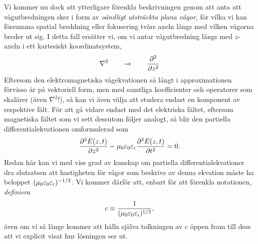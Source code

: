 Vi kommer nu dock att ytterligare f{\"o}renkla beskrivningen genom att anta att
v{\aa}gutbredningen sker i form av {\it o{\"a}ndligt utstr{\"a}ckta plana
v{\aa}gor}, f{\"o}r vilka vi kan f{\"o}rsumma spatial breddning eller
fokusering tv{\"a}rs axeln l{\"a}ngs med vilken v{\aa}gorna breder ut sig.
I detta fall ers{\"a}tter vi, om vi antar v{\aa}gutbredning l{\"a}ngs med
$z$-axeln i ett kartesiskt koordinatsystem,
\hl{$$
  \nabla^2\qquad\to\qquad{{\partial^2}\over{\partial z^2}}
$$}
Eftersom den elektromagnetiska v{\aa}gekvationen s{\aa} l{\aa}ngt i
approximationen f{\"o}rvisso {\"a}r p{\aa} vektoriell form, men med samtliga
koefficienter och operatorer som skal{\"a}rer ({\"a}ven $\nabla^2$!), s{\aa}
kan vi {\"a}ven v{\"a}lja att studera endast en komponent av respektive
f{\"a}lt. F{\"o}r att g{\aa} vidare endast med det elektriska f{\"a}ltet,
eftersom magnetiska f{\"a}ltet som vi sett dessutom f{\"o}ljer analogt, s{\aa}
blir den partiella differentialekvationen omformulerad som
\hl{$$
  {{\partial^2 E(z,t)}\over{\partial z^2}}
    -\mu_0\varepsilon_0\varepsilon_{\rm r}
      {{\partial^2 E(z,t)}\over{\partial t^2}} = 0.
$$}
Redan h{\"a}r kan vi med viss grad av kunskap om partiella
differentialekvationer dra slutsatsen att hastigheten f{\"o}r v{\aa}gor som
beskrivs av denna ekvation m{\aa}ste ha beloppet
$(\mu_0\varepsilon_0\varepsilon_{\rm r})^{-1/2}$.
Vi kommer d{\"a}rf{\"o}r att, enbart f{\"o}r att f{\"o}renkla notationen,
{\it definiera}
\hl{$$
  c \equiv {{1}\over{(\mu_0\varepsilon_0\varepsilon_{\rm r})^{1/2}}},
$$}
{\"a}ven om vi s{\aa} l{\"a}nge kommer att h{\aa}lla sj{\"a}lva tolkningen av
$c$ {\"o}ppen fram till dess att vi explicit visat hur l{\"o}sningen ser ut.
\vfill\eject

